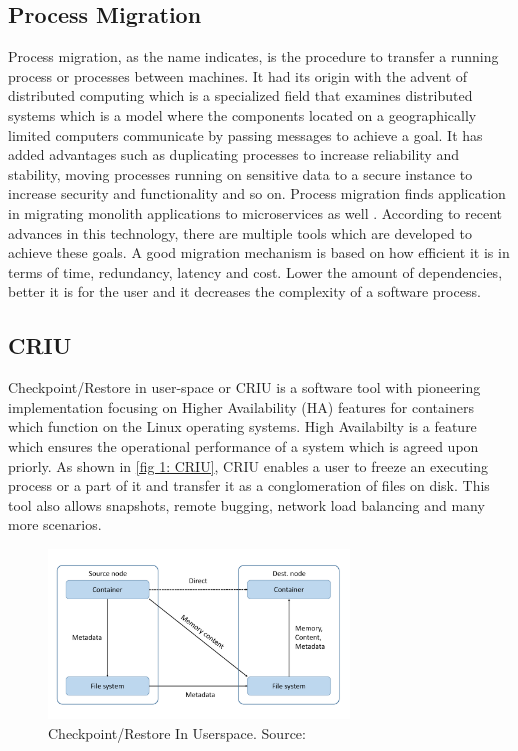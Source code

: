 \documentclass[conference]{IEEEtran}
\begin{document}
\subsection{Process Migration}
\label{subsec: 1d.process migration}
Process migration, as the name indicates, is the procedure to transfer a running process or processes between machines. It had its origin with the advent of distributed computing which is a specialized field that examines distributed systems which is a model where the components located on a geographically limited computers communicate by passing messages to achieve a goal. 
It has added advantages such as duplicating processes to increase reliability and stability, moving processes running on sensitive data to a secure instance to increase security and functionality and so on. Process migration finds application in migrating monolith applications to microservices as well \cite{OConnor2017ContinuousPerspective}. According to recent advances in this technology, there are multiple tools which are developed to achieve these goals. A good migration mechanism is based on how efficient it is in terms of time, redundancy, latency and cost. Lower the amount of dependencies, better it is for the user and it decreases the complexity of a software process.


\subsection{CRIU} 
\label{subsec: 1c.criu}
Checkpoint/Restore in user-space or CRIU is a software tool with pioneering implementation focusing on Higher Availability (HA) \cite{Li2015ComparingAvailability} features for containers which function on the Linux operating systems. High Availabilty is a feature which ensures the operational performance of a system which is agreed upon priorly. As shown in \ref{fig 1: CRIU}, CRIU enables a user to freeze an executing process or a part of it and transfer it as a conglomeration of files on disk\cite{Pickartz2016MigratingCRIU}. This tool also allows snapshots, remote bugging, network load balancing and many more scenarios.

\begin{figure}[h!]
 \centering
 \includegraphics[width = 8cm]{CRIU.pdf}
 \caption{Checkpoint/Restore In Userspace. Source: \cite{Pickartz2016MigratingCRIU}}
 \label{fig 2: CRIU}
\end{figure}
\end{document}
